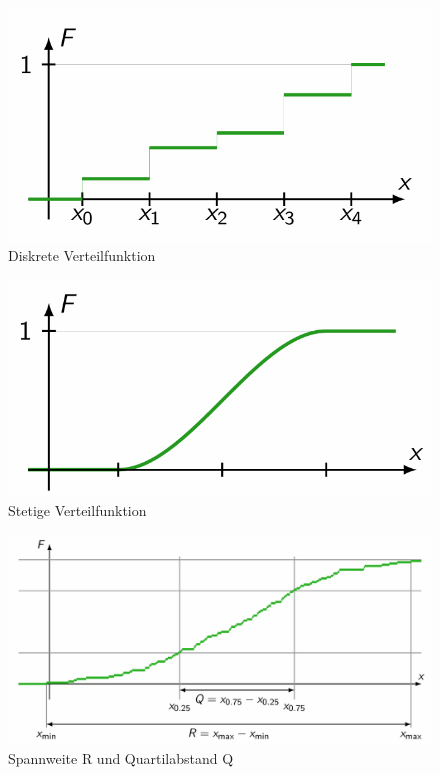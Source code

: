 \documentclass[../Main.tex]{subfiles}
\begin{document}
\begin{figure}[H]
    \centering
    \includegraphics[width=0.5\linewidth]{Images/stetigef.png}
    \caption{Diskrete Verteilfunktion}
    \label{fig:enter-label}
\end{figure}
\begin{figure}[H]
    \centering
    \includegraphics[width=0.5\linewidth]{Images/stetf.png}
    \caption{Stetige Verteilfunktion}
    \label{fig:enter-label}
\end{figure}
\begin{figure}[H]
    \centering
    \includegraphics[width=1\linewidth]{Images/spannweitequartilabstand.png}
    \caption{Spannweite R und Quartilabstand Q}
    \label{fig:enter-label}
\end{figure}
\end{document}
